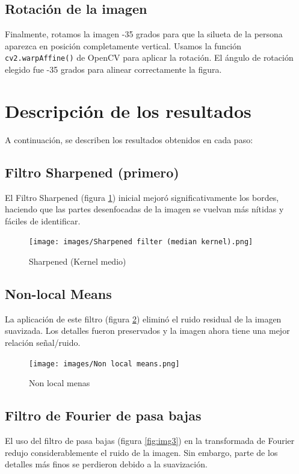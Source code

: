\documentclass{article}
\begin{document}
\subsection{Rotación de la imagen}
Finalmente, rotamos la imagen -35 grados para que la silueta de la persona aparezca en posición completamente vertical. Usamos la función \texttt{cv2.warpAffine()} de OpenCV para aplicar la rotación. El ángulo de rotación elegido fue -35 grados para alinear correctamente la figura.

\section{Descripción de los resultados}
A continuación, se describen los resultados obtenidos en cada paso:

\subsection{Filtro Sharpened (primero)}
El Filtro Sharpened (figura \ref{fig:img1}) inicial mejoró significativamente los bordes, haciendo que las partes desenfocadas de la imagen se vuelvan más nítidas y fáciles de identificar.

\begin{figure}[!ht]
    \centering
    \texttt{[image: images/Sharpened filter (median kernel).png]}
    \caption{Sharpened (Kernel medio)}
    \label{fig:img1}
\end{figure}

\subsection{Non-local Means}
La aplicación de este filtro (figura \ref{fig:img2}) eliminó el ruido residual de la imagen suavizada. Los detalles fueron preservados y la imagen ahora tiene una mejor relación señal/ruido.

\begin{figure}[!ht]
    \centering
    \texttt{[image: images/Non local means.png]}
    \caption{Non local menas}
    \label{fig:img2}
\end{figure}

\subsection{Filtro de Fourier de pasa bajas}
El uso del filtro de pasa bajas (figura \ref{fig:img3}) en la transformada de Fourier redujo considerablemente el ruido de la imagen. Sin embargo, parte de los detalles más finos se perdieron debido a la suavización.
\end{document}
